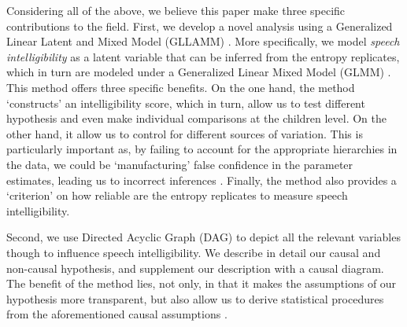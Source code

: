 Considering all of the above, we believe this paper make three specific contributions to the field. First, we develop a novel analysis using a Generalized Linear Latent and Mixed Model (GLLAMM) \cite{Rabe_et_al_2004a, Rabe_et_al_2004b, Rabe_et_al_2004c, Rabe_et_al_2012, Skrondal_et_al_2004a}. More specifically, we model \textit{speech intelligibility} as a latent variable \cite{Everitt_1984} that can be inferred from the entropy replicates, which in turn are modeled under a Generalized Linear Mixed Model (GLMM) \cite{Breslow_et_al_1993, Nelder_et_al_1996, Nelder_et_al_1983}. This method offers three specific benefits. On the one hand, the method `constructs' an intelligibility score, which in turn, allow us to test different hypothesis and even make individual comparisons at the children level. On the other hand, it allow us to control for different sources of variation. This is particularly important as, by failing to account for the appropriate hierarchies in the data, we could be `manufacturing' false confidence in the parameter estimates, leading us to incorrect inferences \cite{McElreath_2020}. Finally, the method also provides a `criterion' on how reliable are the entropy replicates to measure speech intelligibility.

Second, we use Directed Acyclic Graph (DAG) \cite{Pearl_2009, Cinelli_et_al_2021} to depict all the relevant variables though to influence speech intelligibility. We describe in detail our causal and non-causal hypothesis, and supplement our description with a causal diagram. The benefit of the method lies, not only, in that it makes the assumptions of our hypothesis more transparent, but also allow us to derive statistical procedures from the aforementioned causal assumptions \cite{McElreath_2020, Yarkoni_2020, Rohrer_et_al_2021}.


\begin{comment}
Third, we wrap the analysis procedure under the Bayesian framework, providing the assumptions, and the steps required to reproduce the computational implementation of the models. Hypothesis seem clear cut with classical statistics, but bayesian modeling allow us to have a more nuanced view of the models, their inferences and conclusions

Considering all of the above, this paper seeks to investigates the speech intelligibility levels of normal hearing (NH) versus hearing-impaired children with cochlear implants (HI/CI). For that purpose, ten utterances recordings, from thirty two NH and HI/CI children, were selected from a large corpus of \textit{spontaneously spoken speech} collected by the CLiPS research center. Additionally, we set up an experiment, where one hundred language students transcribed each stimuli to the Qualtrics environment \cite{Qualtrics_2005}. Finally, the transcriptions were transformed into an entropy measure per utterance, which served as our outcome variable.
\end{comment}
%
%
